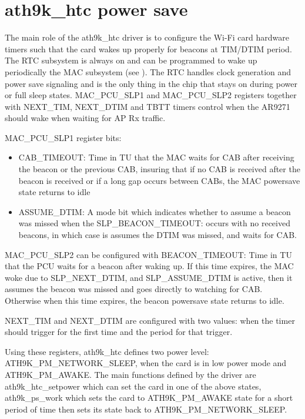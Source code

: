 \section{ath9k_htc power save}
\label{sec:ath9khtc}

The main role of the ath9k_htc driver is to configure the Wi-Fi card hardware timers such that the card wakes up properly for beacons at TIM/DTIM period. The RTC subsystem is always on and can be programmed to wake up periodically the MAC subsystem (see ). The RTC handles clock generation and power save signaling and is the only thing in the chip that stays on during power or full sleep states. MAC_PCU_SLP1 and MAC_PCU_SLP2 registers together  with NEXT_TIM, NEXT_DTIM and TBTT timers control when the AR9271 should wake when waiting for AP Rx traffic.

MAC_PCU_SLP1 register bits:
\begin{itemize}
\item CAB_TIMEOUT: Time in TU that the MAC waits for CAB after receiving the beacon or the previous
CAB, insuring that if no CAB is received after the beacon is received or if a long gap occurs between CABs, the MAC powersave state returns to idle
\item ASSUME_DTIM: A mode bit which indicates whether to assume a beacon was missed when the
SLP_BEACON_TIMEOUT: occurs with no received beacons, in which case is assumes
the DTIM was missed, and waits for CAB.
\end{itemize}

MAC_PCU_SLP2 can be configured with BEACON_TIMEOUT: Time in TU that the PCU waits for a beacon after waking up. If this time expires, the MAC woke due to SLP_NEXT_DTIM, and SLP_ASSUME_DTIM is active, then it assumes the beacon was missed and goes directly to watching for CAB. Otherwise when this time expires, the beacon powersave state returns to idle.

NEXT_TIM and NEXT_DTIM are configured with two values: when the timer should trigger for the first time and the period for that trigger.

Using these registers, ath9k_htc defines two power level: ATH9K_PM_NETWORK_SLEEP, when the card is in low power mode and ATH9K_PM_AWAKE. The main functions defined by the driver are ath9k_htc_setpower which can set the card in one of the above states, ath9k_ps_work which sets the card to ATH9K_PM_AWAKE state for a short period of time then sets its state back to ATH9K_PM_NETWORK_SLEEP.

